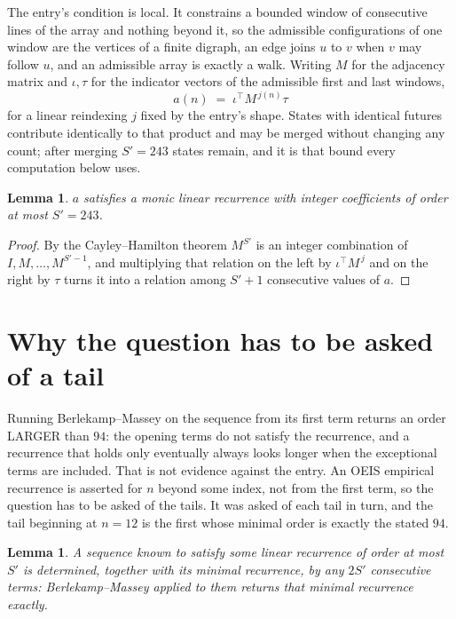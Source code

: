 \documentclass[11pt,a4paper]{article}
\theoremstyle{plain}
\newtheorem{lemma}[theorem]{Lemma}
\theoremstyle{definition}
\begin{document}
The entry's condition is local. It constrains a bounded window of consecutive lines of the
array and nothing beyond it, so the admissible configurations of one window are the vertices of
a finite digraph, an edge joins $u$ to $v$ when $v$ may follow $u$, and an admissible array is
exactly a walk. Writing $M$ for the adjacency matrix and $\iota,\tau$ for the indicator vectors
of the admissible first and last windows,
\[
a(n)\;=\;\iota^{\!\top}M^{\,j(n)}\tau
\]
for a linear reindexing $j$ fixed by the entry's shape. States with identical futures
contribute identically to that product and may be merged without changing any count; after
merging $S'=243$ states remain, and it is that bound every computation below uses.

\begin{lemma}\label{lem:cf}
$a$ satisfies a monic linear recurrence with integer coefficients of order at most $S'=243$.
\end{lemma}

\begin{proof}
By the Cayley--Hamilton theorem $M^{S'}$ is an integer combination of $I,M,\dots,M^{S'-1}$,
and multiplying that relation on the left by $\iota^{\!\top}M^{\,j}$ and on the right by
$\tau$ turns it into a relation among $S'+1$ consecutive values of $a$.
\end{proof}

\section{Why the question has to be asked of a tail}

Running Berlekamp--Massey on the sequence from its first term returns an order LARGER than $94$: the opening terms do not satisfy the recurrence, and a recurrence that holds only eventually always looks longer when the exceptional terms are included. That is not evidence against the entry. An OEIS empirical recurrence is asserted for $n$ beyond some index, not from the first term, so the question has to be asked of the tails. It was asked of each tail in turn, and the tail beginning at $n=12$ is the first whose minimal order is exactly the stated $94$.

\begin{lemma}\label{lem:bm}
A sequence known to satisfy some linear recurrence of order at most $S'$ is determined,
together with its minimal recurrence, by any $2S'$ consecutive terms: Berlekamp--Massey applied
to them returns that minimal recurrence exactly.
\end{lemma}
\end{document}

